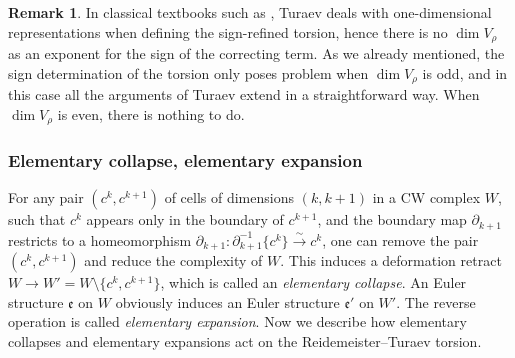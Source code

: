 \documentclass[10pt]{amsart}
\theoremstyle{plain}
\theoremstyle{definition}
\newtheorem{rmrk}[thm]{Remark}
\theoremstyle{remark}
\numberwithin{equation}{section}
\begin{document}
\begin{rmrk}
In classical textbooks such as \cite{Turaev_book, Turaev_tors}, Turaev deals with one-dimensional representations when defining the sign-refined torsion, hence there is no $\dim V_\rho$ as an exponent for the sign of the correcting term. As we already mentioned, the sign determination of the torsion only poses problem when $\dim V_\rho$ is odd, and in this case all the arguments of Turaev extend in a straightforward way. When $\dim V_\rho$ is even, there is nothing to do.
\end{rmrk}

\subsubsection{Elementary collapse, elementary expansion}

For any pair $(c^k, c^{k+1})$ of cells of dimensions $(k,k+1)$ in a CW complex $W$, such that $c^k$ appears only in the boundary of $c^{k+1}$, and the boundary map $\partial_{k+1}$ restricts to a homeomorphism \hbox{$\partial_{k+1} \!\colon\! \partial_{k+1}^{-1}\{c^k\} \!\xrightarrow{\sim}\!c^k$}, one can remove the pair $(c^k, c^{k+1})$ and reduce the complexity of $W$. This induces a deformation retract $W \to W' = W \setminus \{c^k, c^{k+1}\}$, which is called an \emph{elementary collapse}. An Euler structure $\mathfrak e$ on $W$ obviously induces an Euler structure $\mathfrak e'$ on $W'$. The reverse operation is called \emph{elementary expansion}.
Now we describe how elementary collapses and elementary expansions act on the Reidemeister--Turaev torsion.
\end{document}
